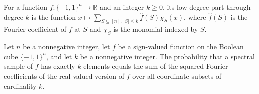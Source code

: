 \begin{definition}
\label{FABL.lowDegreePart}
\leanok
{}
For a function $f:\{-1,1\}^n\to\mathbb R$ and an integer $k\ge 0$, its low-degree part
through degree $k$ is the function $x\mapsto\sum_{S\subseteq[n],\,|S|\le k}\widehat
f(S)\chi_S(x)$, where $\widehat f(S)$ is the Fourier coefficient of $f$ at $S$ and
$\chi_S$ is the monomial indexed by $S$.
\end{definition}

\begin{theorem}
\label{FABL.spectralSample_card_eq}
\leanok
{}
Let $n$ be a nonnegative integer, let $f$ be a sign-valued function on the Boolean cube
$\{-1,1\}^n$, and let $k$ be a nonnegative integer. The probability that a spectral
sample of $f$ has exactly $k$ elements equals the sum of the squared Fourier
coefficients of the real-valued version of $f$ over all coordinate subsets of
cardinality $k$.
\end{theorem}
